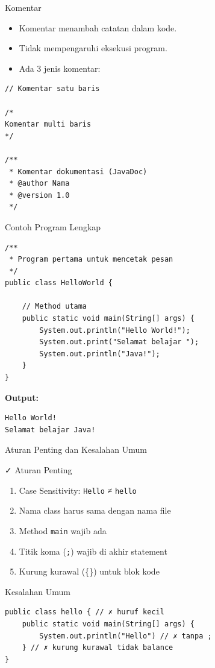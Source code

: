 \documentclass{beamer}
\begin{document}
\begin{frame}[fragile]{Komentar}
  \begin{itemize}
    \item Komentar menambah catatan dalam kode.
    \item Tidak mempengaruhi eksekusi program.
    \item Ada 3 jenis komentar:
  \end{itemize}
\begin{lstlisting}
// Komentar satu baris

/*
Komentar multi baris
*/

/**
 * Komentar dokumentasi (JavaDoc)
 * @author Nama
 * @version 1.0
 */
\end{lstlisting}
\end{frame}

\begin{frame}[fragile]{Contoh Program Lengkap}
\begin{lstlisting}
/**
 * Program pertama untuk mencetak pesan
 */
public class HelloWorld {

    // Method utama
    public static void main(String[] args) {
        System.out.println("Hello World!");
        System.out.print("Selamat belajar ");
        System.out.println("Java!");
    }
}
\end{lstlisting}
\textbf{Output:}
\begin{lstlisting}
Hello World!
Selamat belajar Java!
\end{lstlisting}
\end{frame}

\begin{frame}[fragile]{Aturan Penting dan Kesalahan Umum}
  \begin{block}{✓ Aturan Penting}
    \begin{enumerate}
      \item Case Sensitivity: \texttt{Hello} ≠ \texttt{hello}
      \item Nama class harus sama dengan nama file
      \item Method \texttt{main} wajib ada
      \item Titik koma (\texttt{;}) wajib di akhir statement
      \item Kurung kurawal (\{\}) untuk blok kode
    \end{enumerate}
  \end{block}

  \begin{alertblock}{Kesalahan Umum}
  \vspace{5px}
\begin{lstlisting}
public class hello { // ✗ huruf kecil
    public static void main(String[] args) {
        System.out.println("Hello") // ✗ tanpa ;
    } // ✗ kurung kurawal tidak balance
}
\end{lstlisting}
  \end{alertblock}
\end{frame}
\end{document}
